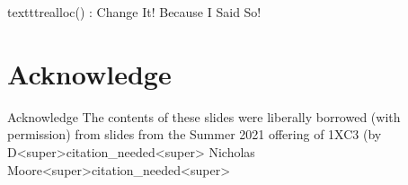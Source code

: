 \documentclass[11pt]{beamer}
\begin{document}
\begin{frame}{texttt{realloc()} : Change It! Because I Said So!}
\center
\
\end{frame}


\section[Acknowledge]{Acknowledge}
\begin{frame}{Acknowledge}
\center
\vspace{8em}
The contents of these slides were liberally borrowed (with permission) from slides from the Summer 2021 offering of 1XC3 (by D<super>citation_needed<super> Nicholas Moore<super>citation_needed<super>  
\end{frame}
\end{document}
